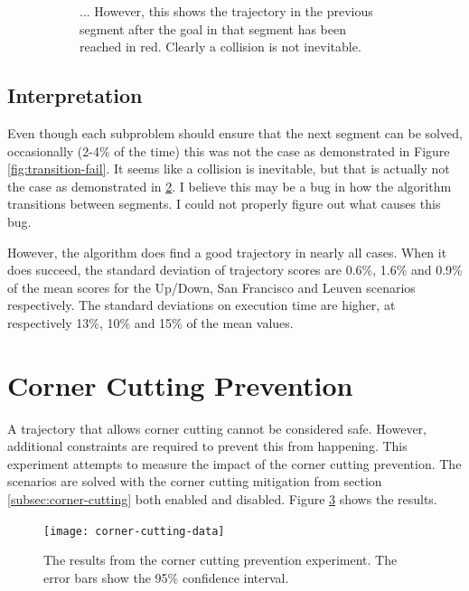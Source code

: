 \begin{figure}[t]
\begin{subfigure}[t]{.45\textwidth}
        		\caption{... However, this shows the trajectory in the previous segment after the goal in that segment has been reached in red. Clearly a collision is not inevitable.}
        		\label{fig:leuven-fail-post}
	\end{subfigure}	
	
        
    \caption[A demonstration that the segment transition failures are not caused by impossible starting states]{}\label{fig:leuven-fail}
\end{figure}
\subsection{Interpretation}
Even though each subproblem should ensure that the next segment can be solved, occasionally (2-4\% of the time) this was not the case as demonstrated in Figure \ref{fig:transition-fail}. It seems like a collision is inevitable, but that is actually not the case as demonstrated in \ref{fig:leuven-fail}. I believe this may be a bug in how the algorithm transitions between segments. I could not properly figure out what causes this bug.
\par
However, the algorithm does find a good trajectory in nearly all cases. When it does succeed, the standard deviation of trajectory scores are 0.6\%, 1.6\% and 0.9\% of the mean scores for the Up/Down, San Francisco and Leuven scenarios respectively. The standard deviations on execution time are higher, at respectively 13\%, 10\% and 15\% of the mean values.






\clearpage
\section{Corner Cutting Prevention}
\label{subsec:cutting}
A trajectory that allows corner cutting cannot be considered safe. However, additional constraints are required to prevent this from happening. This experiment attempts to measure the impact of the corner cutting prevention. The scenarios are solved with the corner cutting mitigation from section \ref{subsec:corner-cutting} both enabled and disabled. Figure \ref{fig:corner-data} shows the results. 

\begin{figure}[]
	\centering
	\texttt{[image: corner-cutting-data]}
	\caption[The results from the corner cutting prevention experiment]{The results from the corner cutting prevention experiment. The error bars show the 95\% confidence interval.}
	\label{fig:corner-data}
\end{figure}

